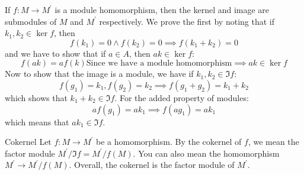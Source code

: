 \documentclass{report}
\begin{document}
If $f: M \rightarrow M^{\prime}$ is a module homomorphism, then the kernel and image are submodules of $M$ and $M^{\prime}$ respectively. We prove the first by noting that if $k_{1}, k_{2} \in \ker{f}$, then
    \begin{equation*}
        f(k_{1}) = 0 \land f(k_{2}) = 0 \implies f(k_{1} + k_{2}) = 0
    \end{equation*}
and we have to show that if $a \in A$, then $ak \in \ker{f}$:
    \begin{equation*}
        f(ak) = af(k) \text{Since we have a module homomorphism} \implies ak \in \ker{f}
    \end{equation*}
Now to show that the image is a module, we have if $k_{1}, k_{2} \in \Im{f}$:
    \begin{equation*}
        f(g_{1}) = k_{1}, f(g_{2}) = k_{2} \implies f(g_{1} + g_{2}) = k_{1} + k_{2}
    \end{equation*}
which shows that $k_{1} + k_{2} \in \Im{f}$. For the added property of modules:
    \begin{equation*}
        af(g_{1}) = ak_{1} \implies f(ag_{1}) = ak_{1}
    \end{equation*}
which means that $ak_{1} \in \Im{f}$.

\begin{definition}{Cokernel}
    Let $f : M \rightarrow M^{\prime}$ be a homomorphism. By the cokernel of $f$, we mean the factor module $M^{\prime}/\Im{f} = M^{\prime}/f(M)$. You can also mean the homomorphism $M^{\prime} \rightarrow M^{\prime}/f(M)$. Overall, the cokernel is the factor module of $M^{\prime}$.
\end{definition}
\end{document}
